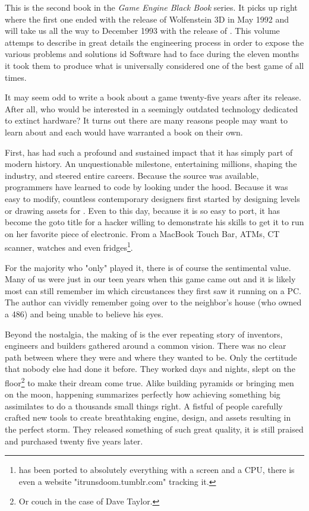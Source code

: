 This is the second book in the \textit{Game Engine Black Book} series. It picks up right where the first one ended with the release of Wolfenstein 3D in May 1992 and will take us all the way to December 1993 with the release of \doom. This volume attemps to describe in great details the engineering process in order to expose the various problems and solutions id Software had to face during the eleven months it took them to produce what is universally considered one of the best game of all times.\\
\par
It may seem odd to write a book about a game twenty-five years after its release. After all, who would be interested in a seemingly outdated technology dedicated to extinct hardware? It turns out there are many reasons people may want to learn about \doom and each would have warranted a book on their own.\\ 
\par
First, \doom has had such a profound and sustained impact that it has simply part of modern history. An unquestionable milestone, entertaining millions, shaping the industry, and steered entire careers. Because the source was available, programmers have learned to code by looking under the hood. Because it was easy to modify, countless contemporary designers first started by designing levels or drawing assets for \doom. Even to this day, because it is so easy to port, it has become the goto title for a hacker willing to demonstrate his skills to get it to run on her favorite piece of electronic. From a MacBook Touch Bar, ATMs, CT scanner, watches and even fridges\footnote{\doom has been ported to absolutely everything with a screen and a CPU, there is even a website "itrunsdoom.tumblr.com" tracking it.}.\\
\par
For the majority who "only" played it, there is of course the sentimental value. Many of us were just in our teen years when this game came out and it is likely most can still remember im which circustances they first saw it running on a PC. The author can vividly remember going over to the neighbor's house (who owned a 486) and being unable to believe his eyes.\\
\par
Beyond the nostalgia, the making of \doom is the ever repeating story of inventors, engineers and builders gathered around a common vision. There was no clear path between where they were and where they wanted to be. Only the certitude that nobody else had done it before. They worked days and nights, slept on the floor\footnote{Or couch in the case of Dave Taylor.} to make their dream come true. Alike building pyramids or bringing men on the moon, \doom happening summarizes perfectly how achieving something big assimilates to do a thousands small things right. A fistful of people carefully crafted new tools to create breathtaking engine, design, and assets resulting in the perfect storm. They released something of such great quality, it is still praised and purchased twenty five years later.\\
